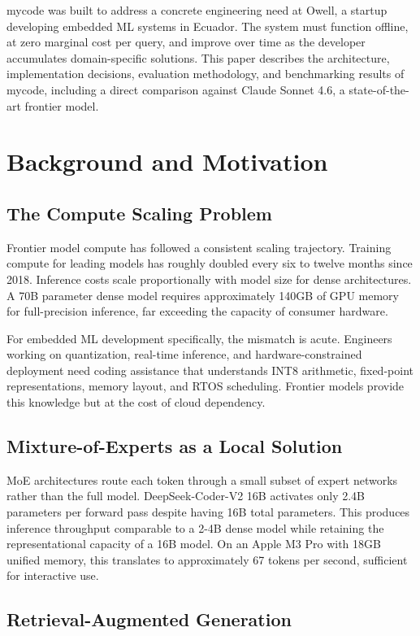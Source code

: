 \documentclass[11pt,twocolumn]{article}
\begin{document}
mycode was built to address a concrete engineering need at Owell, a startup
developing embedded ML systems in Ecuador. The system must function offline,
at zero marginal cost per query, and improve over time as the developer
accumulates domain-specific solutions. This paper describes the architecture,
implementation decisions, evaluation methodology, and benchmarking results of
mycode, including a direct comparison against Claude Sonnet 4.6, a
state-of-the-art frontier model.

\section{Background and Motivation}

\subsection{The Compute Scaling Problem}

Frontier model compute has followed a consistent scaling trajectory. Training
compute for leading models has roughly doubled every six to twelve months
since 2018. Inference costs scale proportionally with model size for dense
architectures. A 70B parameter dense model requires approximately 140GB of
GPU memory for full-precision inference, far exceeding the capacity of
consumer hardware.

For embedded ML development specifically, the mismatch is acute. Engineers
working on quantization, real-time inference, and hardware-constrained
deployment need coding assistance that understands INT8 arithmetic, fixed-point
representations, memory layout, and RTOS scheduling. Frontier models provide
this knowledge but at the cost of cloud dependency.

\subsection{Mixture-of-Experts as a Local Solution}

MoE architectures route each token through a small subset of expert networks
rather than the full model. DeepSeek-Coder-V2 16B activates only 2.4B
parameters per forward pass despite having 16B total parameters. This produces
inference throughput comparable to a 2-4B dense model while retaining the
representational capacity of a 16B model. On an Apple M3 Pro with 18GB
unified memory, this translates to approximately 67 tokens per second,
sufficient for interactive use.

\subsection{Retrieval-Augmented Generation}
\end{document}
